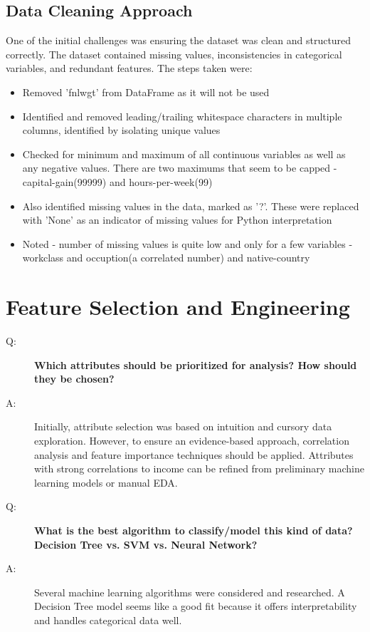 \documentclass[journal,onecolumn]{IEEEtran}
\begin{document}
\subsection{Data Cleaning Approach}
One of the initial challenges was ensuring the dataset was clean and structured correctly. The dataset contained missing values, inconsistencies in categorical variables, and redundant features. The steps taken were:
\begin{itemize}
    \item Removed 'fnlwgt' from DataFrame as it will not be used
    \item Identified and removed leading/trailing whitespace characters in multiple columns, identified by isolating unique values
    \item Checked for minimum and maximum of all continuous variables as well as any negative values. There are two maximums that seem to be capped - capital-gain(99999) and hours-per-week(99)
    \item Also identified missing values in the data, marked as '?'. These were replaced with 'None' as an indicator of missing values for Python interpretation
    \item Noted - number of missing values is quite low and only for a few variables - workclass and occuption(a correlated number) and native-country
\end{itemize}

\section{Feature Selection and Engineering}

\begin{description}
    \item[Q:] \textbf{Which attributes should be prioritized for analysis? How should they be chosen?}
    \item[A:] Initially, attribute selection was based on intuition and cursory data exploration. However, to ensure an evidence-based approach, correlation analysis and feature importance techniques should be applied. Attributes with strong correlations to income can be refined from preliminary machine learning models or manual EDA.

    \item[Q:] \textbf{What is the best algorithm to classify/model this kind of data? Decision Tree vs. SVM vs. Neural Network?}
    \item[A:] Several machine learning algorithms were considered and researched. A Decision Tree model seems like a good fit because it offers interpretability and handles categorical data well.

\end{description}
\end{document}

